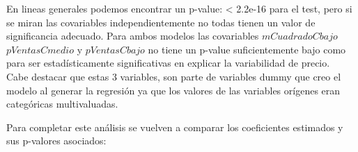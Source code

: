 En lineas generales podemos encontrar un p-value: < 2.2e-16 para el test, pero si se miran las covariables independientemente no todas tienen un valor de significancia adecuado.
Para ambos modelos las covariables $mCuadradoCbajo$ $pVentasCmedio$ y $pVentasCbajo$ no tiene un p-value suficientemente bajo como para ser estadísticamente significativas en explicar la variabilidad de precio.\\
Cabe destacar que estas 3 variables, son parte de variables dummy que creo el modelo al generar la regresión ya que los valores de las variables orígenes eran categóricas multivaluadas.

Para completar este análisis se vuelven a comparar los coeficientes estimados y sus p-valores asociados:\\

\begin{figure}[H]
\end{figure}
